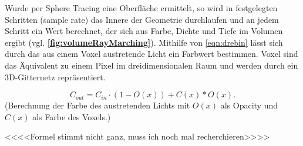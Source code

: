 Wurde per Sphere Tracing eine Oberfläche ermittelt, so wird in festgelegten Schritten (sample rate) das Innere der Geometrie durchlaufen
und an jedem Schritt ein Wert berechnet, der sich aus Farbe, Dichte und Tiefe im Volumen ergibt (vgl. \textbf{\autoref{fig:volumeRayMarching}}).
Mithilfe von \autoref{eqn:drebin} \parencite{Drebin1988} lässt sich durch das aus einem Voxel austretende Licht ein Farbwert bestimmen.
Voxel sind das Äquivalent zu einem Pixel im dreidimensionalen Raum und werden durch ein 3D-Gitternetz repräsentiert.

\begin{equation}
	\label{eqn:drebin}
	C_{out} = C_{in} \cdot (1 - O(x)) + C(x) * O(x).
\end{equation}
(Berechnung der Farbe des austretenden Lichts mit $O(x)$ als Opacity und $C(x)$ als Farbe des Voxels.)


<<<<Formel stimmt nicht ganz, muss ich noch mal recherchieren>>>>

